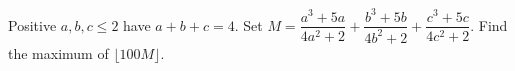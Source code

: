 Positive $a,b,c\le2$ have $a+b+c=4$. Set $M=\dfrac{a^3+5a}{4a^2+2}+\dfrac{b^3+5b}{4b^2+2}+\dfrac{c^3+5c}{4c^2+2}$. Find the maximum of $\lfloor100M\rfloor$.
